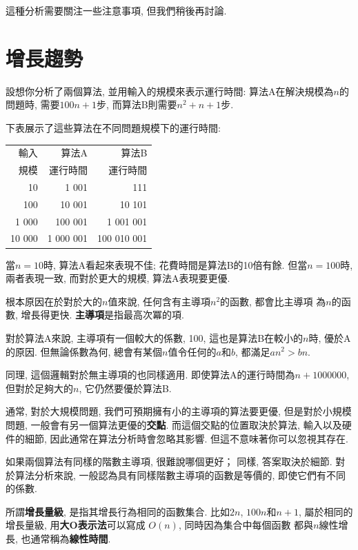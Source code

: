 \documentclass[10pt]{book}
\begin{document}
這種分析需要關注一些注意事項, 但我們稍後再討論. 


\section{增長趨勢}

設想你分析了兩個算法, 並用輸入的規模來表示運行時間:
算法A在解決規模為$n$的問題時, 需要$100n+1$步, 而算法B則需要$n^2 + n + 1$步. 

下表展示了這些算法在不同問題規模下的運行時間:

\begin{tabular}{|r|r|r|}
\hline
輸入     &  算法A     & 算法B \\
規模      &   運行時間     & 運行時間 \\
\hline
10        &   1 001           & 111         \\
100       &   10 001          & 10 101         \\
1 000     &   100 001         & 1 001 001         \\
10 000    &   1 000 001       & 100 010 001         \\
\hline
\end{tabular}

當$n=10$時, 算法A看起來表現不佳; 花費時間是算法B的10倍有餘. 
但當$n=100$時, 兩者表現一致, 而對於更大的規模, 算法A表現要更優. 

根本原因在於對於大的$n$值來說, 任何含有主導項$n^2$的函數, 都會比主導項
為$n$的函數, 增長得更快. 
{\bf 主導項}是指最高次冪的項. 

對於算法A來說, 主導項有一個較大的係數, 100, 這也是算法B在較小的$n$時, 
優於A的原因. 但無論係數為何, 
總會有某個$n$值令任何的$a$和$b$, 都滿足$a n^2 > b n$. 

同理, 這個邏輯對於無主導項的也同樣適用. 
即使算法A的運行時間為$n+1000000$, 但對於足夠大的$n$, 它仍然要優於算法B. 

通常, 對於大規模問題, 我們可預期擁有小的主導項的算法要更優, 
但是對於小規模問題, 一般會有另一個算法更優的{\bf 交點}. 
而這個交點的位置取決於算法, 輸入以及硬件的細節, 
因此通常在算法分析時會忽略其影響. 但這不意味著你可以忽視其存在. 

如果兩個算法有同樣的階數主導項, 很難說哪個更好；
同樣, 答案取決於細節. 
對於算法分析來說, 一般認為具有同樣階數主導項的函數是等價的, 
即使它們有不同的係數. 

所謂{\bf 增長量級}, 是指其增長行為相同的函數集合. 
比如$2n$, $100n$和$n+1$, 屬於相同的增長量級, 
用{\bf 大O表示法}可以寫成 $O(n)$, 同時因為集合中每個函數
都與$n$線性增長, 也通常稱為{\bf 線性時間}. 
\end{document}
